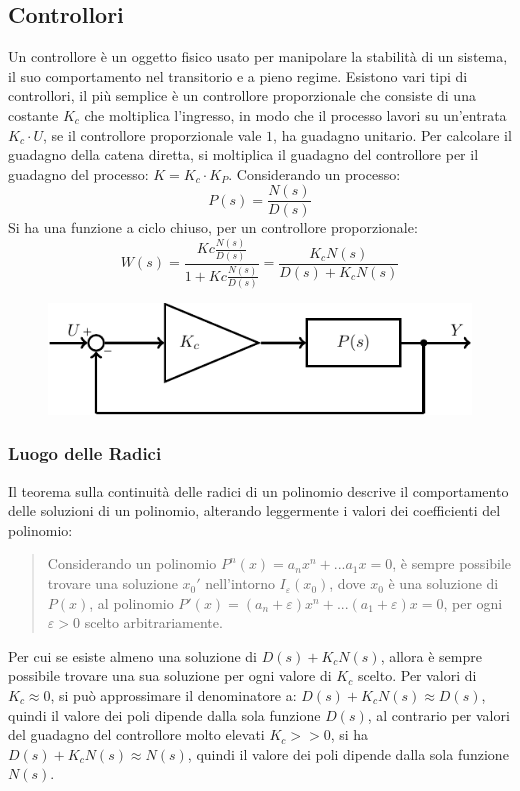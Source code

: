 \documentclass{article}
\numberwithin{equation}{subsection}
\begin{document}
\subsection{Controllori}

Un controllore è un oggetto fisico usato per manipolare la stabilità di un sistema, il suo comportamento nel transitorio e a pieno regime. 
Esistono vari tipi di controllori, il più semplice è un controllore proporzionale che consiste di una costante $K_c$ che moltiplica l'ingresso, in modo 
che il processo lavori su un'entrata $K_c\cdot U$, se il controllore proporzionale vale $1$, ha guadagno unitario. Per calcolare il guadagno della catena 
diretta, si moltiplica il guadagno del controllore per il guadagno del processo: $K=K_c\cdot K_P$. Considerando un processo: 
\begin{equation*}
    P(s)=\displaystyle\frac{N(s)}{D(s)}
\end{equation*}    
Si ha una funzione a ciclo chiuso, per un controllore proporzionale: 
\begin{equation}
    W(s)=\displaystyle\frac{Kc\displaystyle\frac{N(s)}{D(s)}}{1+Kc\displaystyle\frac{N(s)}{D(s)}}=\frac{K_cN(s)}{D(s)+K_cN(s)}
\end{equation}
\begin{figure}[H]%
    \centering
    \includegraphics{controllore-2.pdf}%
\end{figure}

\subsubsection{Luogo delle Radici}

Il teorema sulla continuità delle radici di un polinomio descrive il comportamento delle soluzioni di un polinomio, alterando leggermente i 
valori dei coefficienti del polinomio:
\begin{quotation}
    Considerando un polinomio $P^n(x)=a_nx^n+...a_1x=0$, è sempre possibile trovare una soluzione $x_0'$ nell'intorno $I_{\varepsilon}(x_0)$, dove $x_0$ 
    è una soluzione di $P(x)$, al polinomio $P'(x)=(a_n+\varepsilon)x^n+...(a_1+\varepsilon)x=0$, per ogni $\varepsilon>0$ scelto arbitrariamente. 
\end{quotation} 
Per cui se esiste almeno una soluzione di $D(s)+K_cN(s)$, allora è sempre possibile trovare una sua soluzione per ogni valore di $K_c$ scelto. 
Per valori di $K_c\approx0$, si può approssimare il denominatore a: $D(s)+K_cN(s)\approx D(s)$, quindi il valore dei poli dipende dalla sola 
funzione $D(s)$, al contrario per valori del guadagno del controllore molto elevati $K_c>>0$, si ha $D(s)+K_cN(s)\approx N(s)$, quindi il valore 
dei poli dipende dalla sola funzione $N(s)$.
\end{document}
